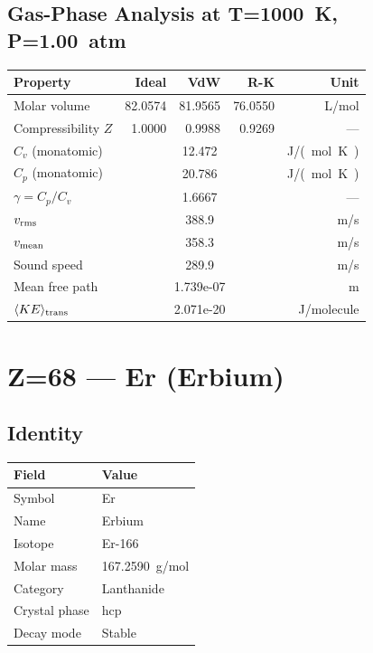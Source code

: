 \documentclass[11pt,a4paper]{article}
\begin{document}
\subsection{Gas-Phase Analysis at T=\SI{1000}{K}, P=\SI{1.00}{atm}}
\begin{tabular}{lrrrr}
  \toprule
  Property & Ideal & VdW & R-K & Unit \\
  \midrule
  Molar volume & 82.0574 & 81.9565 & 76.0550 & \si{L/mol} \\
  Compressibility $Z$ & 1.0000 & 0.9988 & 0.9269 & --- \\
  \midrule
  $C_v$ (monatomic) & \multicolumn{3}{c}{12.472} & \si{J/(mol.K)} \\
  $C_p$ (monatomic) & \multicolumn{3}{c}{20.786} & \si{J/(mol.K)} \\
  $\gamma = C_p/C_v$ & \multicolumn{3}{c}{1.6667} & --- \\
  $v_{\rm rms}$ & \multicolumn{3}{c}{388.9} & \si{m/s} \\
  $v_{\rm mean}$ & \multicolumn{3}{c}{358.3} & \si{m/s} \\
  Sound speed & \multicolumn{3}{c}{289.9} & \si{m/s} \\
  Mean free path & \multicolumn{3}{c}{1.739e-07} & \si{m} \\
  $\langle KE \rangle_{\rm trans}$ & \multicolumn{3}{c}{2.071e-20} & \si{J/molecule} \\
  \bottomrule
\end{tabular}

\newpage

\section{Z=68 --- Er (Erbium)}
\label{sec:Z68}

\subsection{Identity}
\begin{tabular}{ll}
  \toprule
  Field & Value \\
  \midrule
  Symbol & Er \\
  Name & Erbium \\
  Isotope & Er-166 \\
  Molar mass & \SI{167.2590}{g/mol} \\
  Category & Lanthanide \\
  Crystal phase & hcp \\
  Decay mode & Stable \\
  \bottomrule
\end{tabular}
\end{document}
